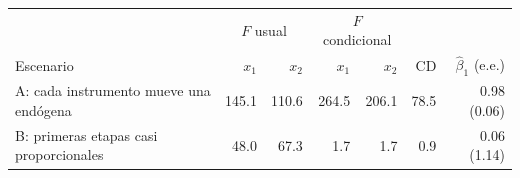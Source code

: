 \begin{tabular}{lrrrrrr}
\hline
 & \multicolumn{2}{c}{$F$ usual} & \multicolumn{2}{c}{$F$ condicional} & & \\
Escenario & $x_1$ & $x_2$ & $x_1$ & $x_2$ & CD & $\hat\beta_1$ (e.e.) \\
\hline
A: cada instrumento mueve una endógena & 145.1 & 110.6 & 264.5 & 206.1 & 78.5 & 0.98 (0.06) \\
B: primeras etapas casi proporcionales & 48.0 & 67.3 & 1.7 & 1.7 & 0.9 & 0.06 (1.14) \\
\hline
\end{tabular}
